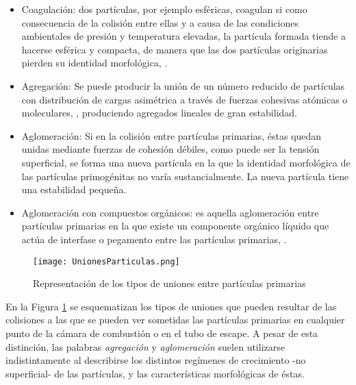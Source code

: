 \begin{itemize}

\item Coagulación: dos partículas, por ejemplo esféricas, coagulan si como consecuencia de la colisión entre ellas y a causa de las condiciones ambientales de presión y temperatura elevadas, la partícula formada tiende a hacerse esférica y compacta, de manera que las dos partículas originarias pierden su identidad morfológica, \cite{heywood:1988}.

\item Agregación: Se puede producir la unión de un número reducido de partículas con distribución de cargas asimétrica a través de fuerzas cohesivas atómicas o moleculares, \cite{heywood:1988}, produciendo agregados lineales de gran estabilidad.

\item Aglomeración: Si en la colisión entre partículas primarias, éstas quedan unidas mediante fuerzas de cohesión débiles, como puede ser la tensión superficial, se forma una nueva partícula en la que la identidad morfológica de las partículas primogénitas no varía sustancialmente. La nueva partícula tiene una estabilidad pequeña.

\item Aglomeración con compuestos orgánicos: es aquella aglomeración entre partículas primarias en la que existe un componente orgánico líquido que actúa de interfase o pegamento entre las partículas primarias, \cite{mikhailovetal:1996}.

\end{itemize}

\begin{figure}[ht]
\centering
	\texttt{[image: UnionesParticulas.png]}	 
	\caption{Representación de los tipos de uniones entre partículas primarias} \label{fig:unionesparticulas}
\end{figure} 

\par En la Figura \ref{fig:unionesparticulas} se esquematizan los tipos de uniones que pueden resultar de las colisiones a las que se pueden ver sometidas las partículas primarias en cualquier punto de la cámara de combustión o en el tubo de escape. A pesar de esta distinción, las palabras \emph{agregación} y \emph{aglomeración} suelen utilizarse indistintamente al describirse los distintos regímenes de crecimiento -no superficial- de las partículas, y las características morfológicas de éstas.

